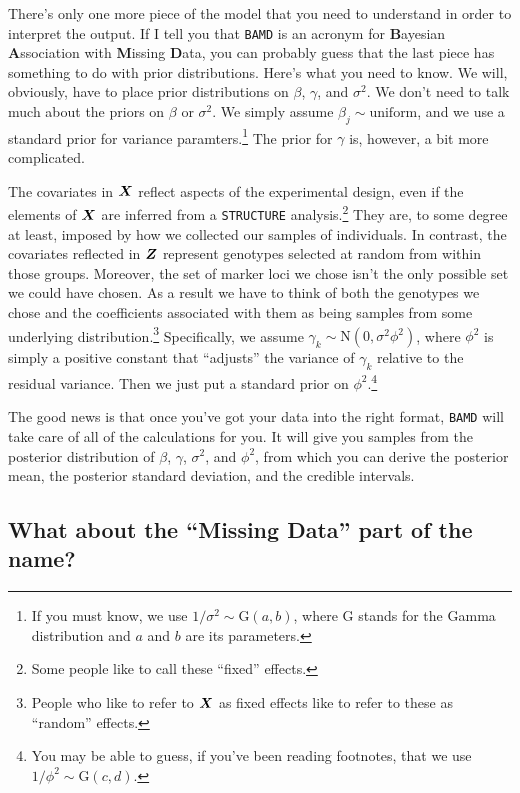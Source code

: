 \documentclass[12pt]{article}
\begin{document}
There's only one more piece of the model that you need to understand
in order to interpret the output. If I tell you that {\tt BAMD} is an
acronym for {\bf B}ayesian {\bf A}ssociation with {\bf M}issing {\bf
  D}ata, you can probably guess that the last piece has something to
do with prior distributions. Here's what you need to know. We will,
obviously, have to place prior distributions on $\beta$, $\gamma$, and
$\sigma^2$. We don't need to talk much about the priors on $\beta$ or
$\sigma^2$. We simply assume $\beta_j \sim \mbox{uniform}$, and we use
a standard prior for variance paramters.\footnote{If you must know, we
  use $1/\sigma^2 \sim \mbox{G}(a, b)$, where $\mbox{G}$ stands for
  the Gamma distribution and $a$ and $b$ are its parameters.} The
prior for $\gamma$ is, however, a bit more
complicated.

The covariates in $\mbox{\boldmath$X$}$ reflect aspects of the
experimental design, even if the elements of $\mbox{\boldmath$X$}$ are
inferred from a {\tt STRUCTURE} analysis.\footnote{Some people like to
  call these ``fixed'' effects.} They are, to some degree at least,
imposed by how we collected our samples of individuals. In contrast,
the covariates reflected in $\mbox{\boldmath$Z$}$ represent genotypes
selected at random from within those groups. Moreover, the set of
marker loci we chose isn't the only possible set we could have
chosen. As a result we have to think of both the genotypes we chose
and the coefficients associated with them as being samples from some
underlying distribution.\footnote{People who like to refer to
  $\mbox{\boldmath$X$}$ as fixed effects like to refer to these as
  ``random'' effects.} Specifically, we assume $\gamma_k \sim
\mbox{N}(0, \sigma^2\phi^2)$, where $\phi^2$ is simply a positive
constant that ``adjusts'' the variance of $\gamma_k$ relative to the
residual variance. Then we just put a standard prior on
$\phi^2$.\footnote{You may be able to guess, if you've been reading
  footnotes, that we use $1/\phi^2 \sim \mbox{G}(c,d)$.}

The good news is that once you've got your data into the right format,
{\tt BAMD} will take care of all of the calculations for you. It will
give you samples from the posterior distribution of $\beta$, $\gamma$,
$\sigma^2$, and $\phi^2$, from which you can derive the posterior
mean, the posterior standard deviation, and the credible
intervals.

\subsection*{What about the ``Missing Data'' part of the name?}
\end{document}
